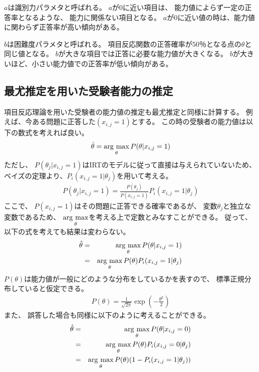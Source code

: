 \documentclass[12pt]{jarticle}
\begin{document}
$a$は識別力パラメタと呼ばれる。
$a$が0に近い項目は、
能力値によらず一定の正答率となるような、
能力に関係ない項目となる。
$a$が$0$に近い値の時は、能力値に関わらず正答率が高い傾向がある。

$b$は困難度パラメタと呼ばれる。
項目反応関数の正答確率が$50％$となる点の$\theta$と同じ値となる。
$b$が大きな項目では正答に必要な能力値が大きくなる。
$b$が大きいほど、小さい能力値での正答率が低い傾向がある。

\subsection{最尤推定を用いた受験者能力の推定}
項目反応理論を用いた受験者の能力値の推定も最尤推定と同様に計算する。
例えば、今ある問題に正答した$(x_{i,j}=1)$とする。
この時の受験者の能力値は以下の数式を考えれば良い。
\begin{equation}
    \hat{\theta}=\mathop{\rm arg~max}\limits_{\theta}P(\theta|x_{i,j}=1)
\end{equation}
ただし、
$P(\theta_j|x_{i,j}=1)$はIRTのモデルに従って直接は与えられていないため、
ベイズの定理より、$P_i(x_{i,j}=1|\theta_j)$を用いて考える。
\begin{eqnarray}
    P(\theta_j|x_{i,j}=1)=\frac{P(\theta_j)}{P(x_{i,j}=1)}P_i(x_{i,j}=1|\theta_j)
\end{eqnarray}
ここで、
$P(x_{i,j}=1)$はその問題に正答できる確率であるが、
変数$\theta_j$と独立な変数であるため、
$\mathop{\rm arg~max}\limits_{\theta}$を考える上で定数とみなすことができる。
従って、以下の式を考えても結果は変わらない。
\begin{eqnarray}
    \hat{\theta}&=&\mathop{\rm arg~max}\limits_{\theta}P(\theta|x_{i,j}=1) \\
    &=&\mathop{\rm arg~max}\limits_{\theta}P(\theta)P_i(x_{i,j}=1|\theta_j)
\end{eqnarray}
$P(\theta)$は能力値が一般にどのような分布をしているかを表すので、
標準正規分布していると仮定できる。
\begin{eqnarray}
    P(\theta)=\frac{1}{\sqrt{2\pi}}\exp \left(-\frac{\theta^2}{2}\right)
\end{eqnarray}
また、
誤答した場合も同様に以下のように考えることができる。
\begin{eqnarray}
    \hat{\theta} &=& \mathop{\rm arg~max}\limits_{\theta}P(\theta|x_{i,j}=0)\\
    &=& \mathop{\rm arg~max}\limits_{\theta}P(\theta)P_i(x_{i,j}=0|\theta_j)\\
    &=& \mathop{\rm arg~max}\limits_{\theta}P(\theta)(1- P_i(x_{i,j}=1|\theta_j))
\end{eqnarray}
\end{document}
